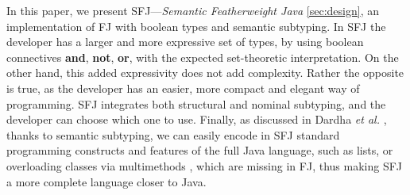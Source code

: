 \documentclass[runningheads]{llncs}
\begin{document}
In this paper, we present SFJ---\emph{Semantic Featherweight Java} \autoref{sec:design}, an implementation of FJ with boolean types and semantic subtyping.
In SFJ the developer has a larger and more expressive set of types, by using boolean connectives \textbf{and}, \textbf{not}, \textbf{or}, with the expected set-theoretic interpretation. On the other hand, this added expressivity does not add complexity. Rather the opposite is true, as the developer has an easier, more compact and elegant way of programming.
SFJ integrates both structural and nominal subtyping, and the developer can choose which one to use.
Finally, as discussed in Dardha \emph{et al.} \cite[\S 8.4]{Dardha2017}, thanks to semantic subtyping, we can easily encode in SFJ standard programming constructs and features of the full Java language, such as lists, or overloading classes via multimethods \cite{BC97}, which are missing in FJ, thus making SFJ a more complete language closer to Java.
\end{document}
